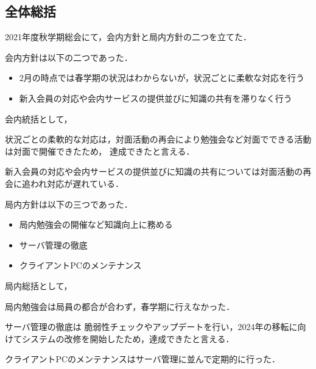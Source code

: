 \subsection*{全体総括}


2021年度秋学期総会にて，会内方針と局内方針の二つを立てた．

会内方針は以下の二つであった．
\begin{itemize}
  \item 2月の時点では春学期の状況はわからないが，状況ごとに柔軟な対応を行う
  \item 新入会員の対応や会内サービスの提供並びに知識の共有を滞りなく行う
\end{itemize}
会内統括として，

状況ごとの柔軟的な対応は，対面活動の再会により勉強会など対面でできる活動は対面で開催できたため，
達成できたと言える．

新入会員の対応や会内サービスの提供並びに知識の共有については対面活動の再会に追われ対応が遅れている．

局内方針は以下の三つであった．
\begin{itemize}
  \item 局内勉強会の開催など知識向上に務める
  \item サーバ管理の徹底
  \item クライアントPCのメンテナンス
\end{itemize}
局内総括として，

局内勉強会は局員の都合が合わず，春学期に行えなかった．

サーバ管理の徹底は
脆弱性チェックやアップデートを行い，2024年の移転に向けてシステムの改修を開始したため，達成できたと言える．

クライアントPCのメンテナンスはサーバ管理に並んで定期的に行った．
